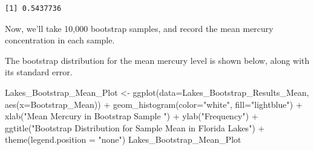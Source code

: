 \documentclass[
  letterpaper,
  DIV=11,
  numbers=noendperiod]{scrreprt}
\newenvironment{Shaded}{\begin{snugshade}}{\end{snugshade}}
\newcommand{\AttributeTok}[1]{\textcolor[rgb]{0.40,0.45,0.13}{#1}}
\newcommand{\CommentTok}[1]{\textcolor[rgb]{0.37,0.37,0.37}{#1}}
\newcommand{\ConstantTok}[1]{\textcolor[rgb]{0.56,0.35,0.01}{#1}}
\newcommand{\ControlFlowTok}[1]{\textcolor[rgb]{0.00,0.23,0.31}{#1}}
\newcommand{\DecValTok}[1]{\textcolor[rgb]{0.68,0.00,0.00}{#1}}
\newcommand{\FunctionTok}[1]{\textcolor[rgb]{0.28,0.35,0.67}{#1}}
\newcommand{\NormalTok}[1]{\textcolor[rgb]{0.00,0.23,0.31}{#1}}
\newcommand{\OtherTok}[1]{\textcolor[rgb]{0.00,0.23,0.31}{#1}}
\newcommand{\SpecialCharTok}[1]{\textcolor[rgb]{0.37,0.37,0.37}{#1}}
\newcommand{\StringTok}[1]{\textcolor[rgb]{0.13,0.47,0.30}{#1}}
\begin{document}
\begin{verbatim}
[1] 0.5437736
\end{verbatim}

Now, we'll take 10,000 bootstrap samples, and record the mean mercury
concentration in each sample.

\begin{Shaded}
\end{Shaded}

The bootstrap distribution for the mean mercury level is shown below,
along with its standard error.

\begin{Shaded}
\begin{Highlighting}[]
\NormalTok{Lakes\_Bootstrap\_Mean\_Plot }\OtherTok{\textless{}{-}} \FunctionTok{ggplot}\NormalTok{(}\AttributeTok{data=}\NormalTok{Lakes\_Bootstrap\_Results\_Mean, }
                                    \FunctionTok{aes}\NormalTok{(}\AttributeTok{x=}\NormalTok{Bootstrap\_Mean)) }\SpecialCharTok{+}  
  \FunctionTok{geom\_histogram}\NormalTok{(}\AttributeTok{color=}\StringTok{"white"}\NormalTok{, }\AttributeTok{fill=}\StringTok{"lightblue"}\NormalTok{) }\SpecialCharTok{+}
  \FunctionTok{xlab}\NormalTok{(}\StringTok{"Mean Mercury in Bootstrap Sample "}\NormalTok{) }\SpecialCharTok{+} \FunctionTok{ylab}\NormalTok{(}\StringTok{"Frequency"}\NormalTok{) }\SpecialCharTok{+}
  \FunctionTok{ggtitle}\NormalTok{(}\StringTok{"Bootstrap Distribution for Sample Mean in Florida Lakes"}\NormalTok{) }\SpecialCharTok{+} 
  \FunctionTok{theme}\NormalTok{(}\AttributeTok{legend.position =} \StringTok{"none"}\NormalTok{) }
\NormalTok{Lakes\_Bootstrap\_Mean\_Plot }
\end{Highlighting}
\end{Shaded}
\end{document}
